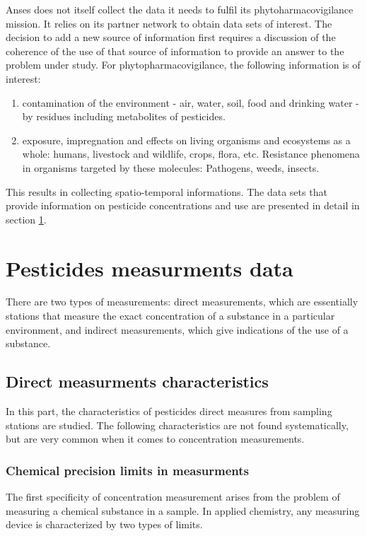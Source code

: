 Anses does not itself collect the data it needs to fulfil its phytoharmacovigilance mission. It relies on its partner network to obtain data sets of interest. The decision to add a new source of information first requires a discussion of the coherence of the use of that source of information to provide an answer to the problem under study. For phytopharmacovigilance, the following information is of interest: 
\begin{enumerate}
\item contamination of the environment - air, water, soil, food and drinking water - by residues including metabolites of pesticides.
\item exposure, impregnation and effects on living organisms and ecosystems as a whole: humans, livestock and wildlife, crops, flora, etc. Resistance phenomena in organisms targeted by these molecules: Pathogens, weeds, insects.
\end{enumerate}
This results in collecting spatio-temporal informations. The data sets that provide information on pesticide concentrations and use are presented in detail in section \ref{chp:2:3}.

\section{Pesticides measurments data}\label{chp:2:3}

There are two types of measurements: direct measurements, which are essentially stations that measure the exact concentration of a substance in a particular environment, and indirect measurements, which give indications of the use of a substance.

\subsection{Direct measurments characteristics}

In this part, the characteristics of pesticides direct measures from sampling stations are studied. The following characteristics are not found systematically, but are very common when it comes to concentration measurements.

\subsubsection{Chemical precision limits in measurments}

The first specificity of concentration measurement arises from the problem of measuring a chemical substance in a sample. In applied chemistry, any measuring device is characterized by two types of limits. 

